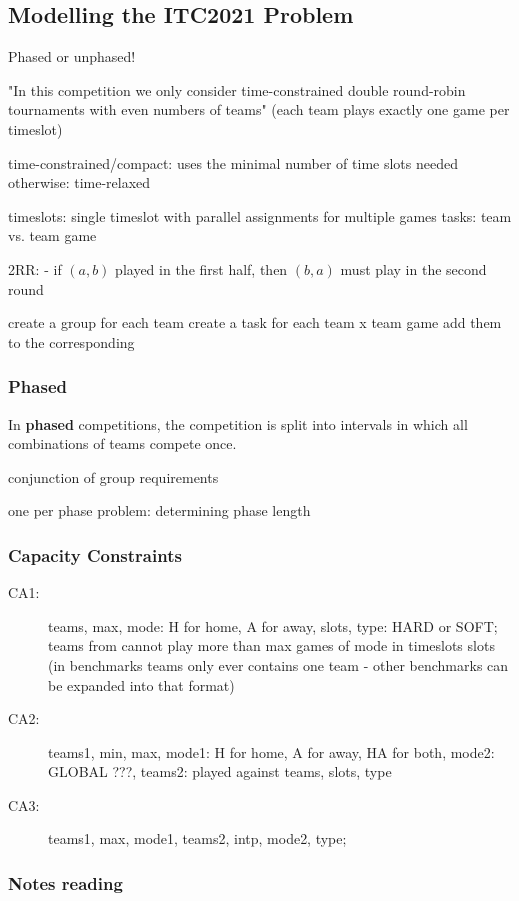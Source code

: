 \subsection{Modelling the ITC2021 Problem}

Phased or unphased!

"In this competition we only consider time-constrained double round-robin tournaments with even numbers of teams" (each team plays exactly one game per timeslot)

time-constrained/compact: uses the minimal number of time slots needed
otherwise: time-relaxed

timeslots: single timeslot with parallel assignments for multiple games
tasks: team vs. team game

2RR:
- if $(a,b)$ played in the first half, then $(b,a)$ must play in the second round

create a group for each team
create a task for each team x team game
add them to the corresponding 


\subsubsection{Phased}

In \textbf{phased} competitions, the competition is split into intervals in which all combinations of teams compete once.

conjunction of group requirements

one per phase 
problem: determining phase length



\subsubsection{Capacity Constraints}
\begin{description}
\item[CA1:] teams, max, mode: H for home, A for away, slots, type: HARD or SOFT; teams from cannot play more than max games of mode in timeslots slots (in benchmarks teams only ever contains one team - other benchmarks can be expanded into that format)
\item[CA2:] teams1, min, max, mode1: H for home, A for away, HA for both, mode2: GLOBAL ???, teams2: played against teams, slots, type
\item[CA3:] teams1, max, mode1, teams2, intp, mode2, type; 
\end{description}


\subsubsection{Notes reading}

